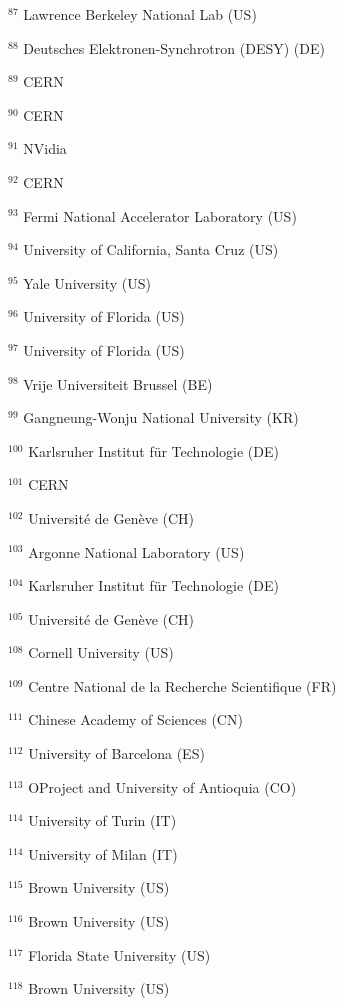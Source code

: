 \par {\footnotesize $^{87}$ Lawrence Berkeley National Lab (US)}
\par {\footnotesize $^{88}$ Deutsches Elektronen-Synchrotron (DESY) (DE)}
\par {\footnotesize $^{89}$ CERN}
\par {\footnotesize $^{90}$ CERN}
\par {\footnotesize $^{91}$ NVidia}
\par {\footnotesize $^{92}$ CERN}
\par {\footnotesize $^{93}$ Fermi National Accelerator Laboratory (US)}
\par {\footnotesize $^{94}$ University of California, Santa Cruz (US)}
\par {\footnotesize $^{95}$ Yale University (US)}
\par {\footnotesize $^{96}$ University of Florida (US)}
\par {\footnotesize $^{97}$ University of Florida (US)}
\par {\footnotesize $^{98}$ Vrije Universiteit Brussel (BE)}
\par {\footnotesize $^{99}$ Gangneung-Wonju National University (KR)}
\par {\footnotesize $^{100}$ Karlsruher Institut f{\"u}r Technologie (DE)}
\par {\footnotesize $^{101}$ CERN}
\par {\footnotesize $^{102}$ Universit{\'e} de Gen{\`e}ve (CH)}
\par {\footnotesize $^{103}$ Argonne National Laboratory (US)}
\par {\footnotesize $^{104}$ Karlsruher Institut f{\"u}r Technologie (DE)}
\par {\footnotesize $^{105}$ Universit{\'e} de Gen{\`e}ve (CH)}
\par {\footnotesize $^{108}$ Cornell University (US)}
\par {\footnotesize $^{109}$ Centre National de la Recherche Scientifique (FR)}
\par {\footnotesize $^{111}$ Chinese Academy of Sciences (CN)}
\par {\footnotesize $^{112}$ University of Barcelona (ES)}
\par {\footnotesize $^{113}$ OProject and University of Antioquia (CO)}
\par {\footnotesize $^{114}$ University of Turin (IT)}
\par {\footnotesize $^{114}$ University of Milan (IT)}
\par {\footnotesize $^{115}$ Brown University (US)}
\par {\footnotesize $^{116}$ Brown University (US)}
\par {\footnotesize $^{117}$ Florida State University (US)}
\par {\footnotesize $^{118}$ Brown University (US)}

\bigskip
